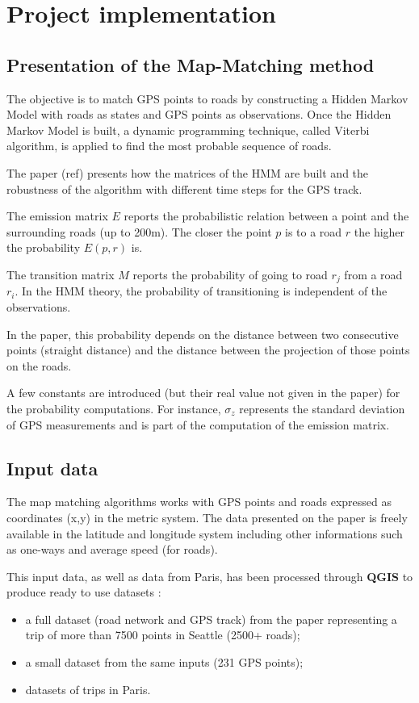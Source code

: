 \chapter{Project implementation}

\section{Presentation of the Map-Matching method}

The objective is to match GPS points to roads by constructing a Hidden Markov Model with roads as states and GPS points as observations. Once the Hidden Markov Model is built, a dynamic programming technique, called Viterbi algorithm, is applied to find the most probable sequence of roads.

The paper (ref) presents how the matrices of the HMM are built and the robustness of the algorithm with different time steps for the GPS track.

The emission matrix $E$ reports the probabilistic relation between a point and the surrounding roads (up to 200m). 
The closer the point $p$ is to a road $r$ the higher the probability $E(p,r)$ is.
	
The transition matrix $M$ reports the probability of going to road $r_j$ from a road $r_i$. In the HMM theory, the probability of transitioning is independent of the observations.

In the paper, this probability depends on the distance between two consecutive points (straight distance) and the distance between the projection of those points on the roads.

A few constants are introduced (but their real value not given in the paper) for the probability computations. For instance, $\sigma_z$ represents the standard deviation of GPS measurements and is part of the computation of the emission matrix.  

\section{Input data}

The map matching algorithms works with GPS points and roads expressed as coordinates (x,y) in the metric system. 
The data presented on the paper is freely available in the latitude and longitude system including other informations such as one-ways and average speed (for roads).

This input data, as well as data from Paris, has been processed through \textbf{QGIS} to produce ready to use datasets :
\begin{itemize}
	\item a full dataset (road network and GPS track) from the paper representing a trip of more than 7500 points in Seattle (2500+ roads);
	\item a small dataset from the same inputs (231 GPS points);
	\item datasets of trips in Paris.
\end{itemize}

